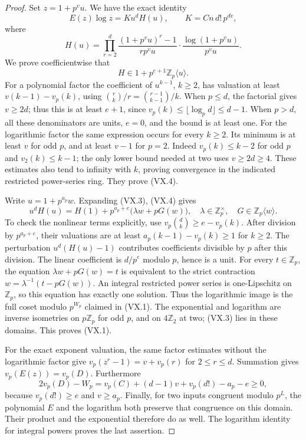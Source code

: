 \begin{proof}
Set \(z=1+p^v u\). We have the exact identity
\[
 E(z)\log z=K u^d H(u),\qquad
 K=Cn\,d!\,p^{dv},
 \tag{VX.3}
\]
where
\[
 H(u)=
 \prod_{r=2}^d
 \frac{(1+p^v u)^r-1}{r p^v u}
 \cdot\frac{\log(1+p^v u)}{p^v u}.
\]
We prove coefficientwise that
\[
 H\in1+p^{e+1}\mathbb Z_p\langle u\rangle.
 \tag{VX.4}
\]
For a polynomial factor the coefficient of
\(u^{k-1}\), \(k\ge2\), has valuation at least
\(v(k-1)-v_p(k)\), using
\(\binom rk/r=\binom{r-1}{k-1}/k\).
When \(p\le d\), the factorial gives \(v\ge2d\);
thus this is at least \(e+1\), since
\(v_p(k)\le\lfloor\log_p d\rfloor\le d-1\).
When \(p>d\), all these denominators are units,
\(e=0\), and the bound is at least one.
For the logarithmic factor the same expression occurs
for every \(k\ge2\). Its minimum is at least \(v\)
for odd \(p\), and at least \(v-1\) for \(p=2\).
Indeed \(v_p(k)\le k-2\) for odd \(p\) and
\(v_2(k)\le k-1\); the only lower bound needed at
two uses \(v\ge2d\ge4\). These estimates also
tend to infinity with \(k\), proving convergence
in the indicated restricted power-series ring.
They prove (VX.4).

Write \(u=1+p^{a_p}w\). Expanding (VX.3), (VX.4) gives
\[
 u^dH(u)=H(1)+p^{a_p+e}
                   \bigl(\lambda w+pG(w)\bigr),
 \quad
 \lambda\in\mathbb Z_p^\times,
 \quad G\in\mathbb Z_p\langle w\rangle.
 \tag{VX.5}
\]
To check the nonlinear terms explicitly, use
\(v_p\binom dk\ge e-v_p(k)\). After division
by \(p^{a_p+e}\), their valuations are at least
\(a_p(k-1)-v_p(k)\ge1\) for \(k\ge2\).
The perturbation \(u^d(H(u)-1)\) contributes
coefficients divisible by \(p\) after this
division. The linear coefficient is
\(d/p^e\) modulo \(p\), hence is a unit.
For every \(t\in\mathbb Z_p\), the equation
\(\lambda w+pG(w)=t\) is equivalent to the
strict contraction
\(w=\lambda^{-1}(t-pG(w))\). An integral
restricted power series is one-Lipschitz on
\(\mathbb Z_p\), so this equation has exactly
one solution. Thus the logarithmic image is the
full coset modulo \(p^{W_p}\) claimed in (VX.1).
The exponential and logarithm are inverse isometries
on \(p\mathbb Z_p\) for odd \(p\), and on
\(4\mathbb Z_2\) at two; (VX.3) lies in these domains.
This proves (VX.1).

For the exact exponent valuation, the same factor
estimates without the logarithmic factor give
\(v_p(z^r-1)=v+v_p(r)\) for \(2\le r\le d\).
Summation gives \(v_p(E(z))=v_p(D)\).
Furthermore
\[
 2v_p(D)-W_p
   =v_p(C)+(d-1)v+v_p(d!)-a_p-e\ge0,
\]
because \(v_p(d!)\ge e\) and \(v\ge a_p\).
Finally, for two inputs congruent modulo \(p^L\),
the polynomial \(E\) and the logarithm both
preserve that congruence on this domain.
Their product and the exponential therefore do
as well. The logarithm identity for integral
powers proves the last assertion.
\end{proof}


